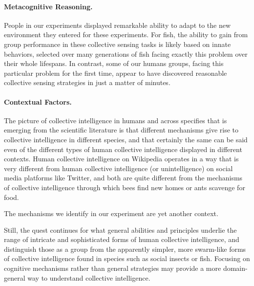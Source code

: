 \documentclass[12pt,letterpaper]{article}
\begin{document}
\paragraph{Metacognitive Reasoning.}

People in our experiments displayed remarkable ability to adapt to the new environment they entered for these experiments. For fish, the ability to
gain from group performance in these collective sensing tasks is
likely based on innate behaviors, selected over many generations of
fish facing exactly this problem over their whole lifespans.  In
contrast, some of our humans groups, facing this particular problem
for the first time, appear to have discovered reasonable collective
sensing strategies in just a matter of minutes.


\paragraph{Contextual Factors.}

The picture of collective intelligence in humans and across specifies that is emerging from the scientific literature is that different mechanisms give rise to collective intelligence in different species, and that certainly the same can be said even of the different types of human collective intelligence displayed in different contexts.  Human collective intelligence on Wikipedia operates in a way that is very different from human collective intelligence (or unintelligence) on social media platforms like Twitter, and both are quite different from the mechanisms of collective intelligence through which bees find new homes or ants scavenge for food. 

The mechanisms we identify in our experiment are yet another context.

Still, the quest continues for what general abilities and principles underlie the range of intricate and sophisticated forms of human collective intelligence, and distinguish those as a group from the apparently simpler, more swarm-like forms of collective intelligence found in species such as social insects or fish.  Focusing on cognitive mechanisms rather than general strategies may provide a more domain-general way to understand collective intelligence.
\end{document}
